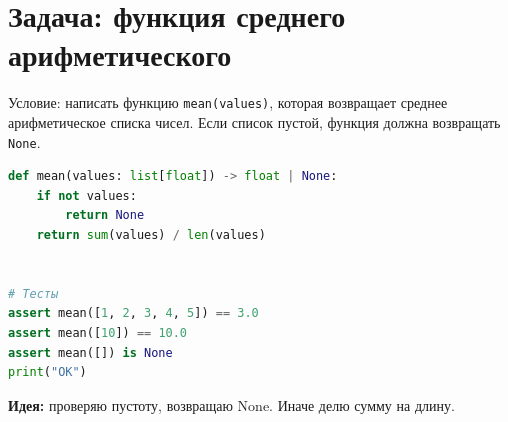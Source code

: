 \documentclass{article}
\begin{document}
\section*{Задача: функция среднего арифметического}

Условие: написать функцию \texttt{mean(values)}, которая возвращает среднее
арифметическое списка чисел. Если список пустой, функция должна возвращать
\texttt{None}.

\begin{lstlisting}[language=Python]
def mean(values: list[float]) -> float | None:
    if not values:
        return None
    return sum(values) / len(values)


# Тесты
assert mean([1, 2, 3, 4, 5]) == 3.0
assert mean([10]) == 10.0
assert mean([]) is None
print("OK")
\end{lstlisting}

\textbf{Идея:} проверяю пустоту, возвращаю None. Иначе делю сумму на длину.
\end{document}
